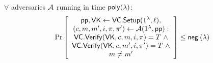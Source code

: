\begin{definition}
\label{def:vc:position-binding-security}
$\forall$ adversaries $\mathcal{A}$ running in time $\mathsf{poly}(\lambda)$:
\begin{align*}
\Pr \left[ \begin{array}{c}
\mathsf{pp},\mathsf{VK} \leftarrow \mathsf{VC.Setup}(1^\lambda, \ell), \\
(c,m,m',i,\pi,\pi') \leftarrow \mathcal{A}(1^\lambda, \mathsf{pp}): \\
\mathsf{VC.Verify}(\mathsf{VK}, c, m, i, \pi) = T\ \wedge \\
\mathsf{VC.Verify}(\mathsf{VK}, c, m', i, \pi') = T\ \wedge \\
m \ne m'
\end{array} \right] \le \mathsf{negl}(\lambda)
\end{align*}
\end{definition}